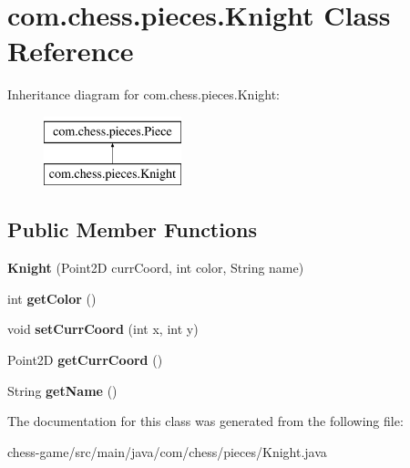 \hypertarget{classcom_1_1chess_1_1pieces_1_1_knight}{}\section{com.\+chess.\+pieces.\+Knight Class Reference}
\label{classcom_1_1chess_1_1pieces_1_1_knight}
Inheritance diagram for com.\+chess.\+pieces.\+Knight\+:\begin{figure}[H]
\begin{center}
\leavevmode
\includegraphics[height=2.000000cm]{classcom_1_1chess_1_1pieces_1_1_knight}
\end{center}
\end{figure}
\subsection*{Public Member Functions}
\begin{DoxyCompactItemize}
\item 
\mbox{\label{classcom_1_1chess_1_1pieces_1_1_knight_a902abfc26eefb14dc79baf1150cc04ab}} 
{\bfseries Knight} (Point2D curr\+Coord, int color, String name)
\item 
\mbox{\label{classcom_1_1chess_1_1pieces_1_1_knight_aef125dc121d519ccd703ba31d6179e46}} 
int {\bfseries get\+Color} ()
\item 
\mbox{\label{classcom_1_1chess_1_1pieces_1_1_knight_a8eb690eecdc63db3d4c64f170a0032a9}} 
void {\bfseries set\+Curr\+Coord} (int x, int y)
\item 
\mbox{\label{classcom_1_1chess_1_1pieces_1_1_knight_a59afbf816626751ca2d72148f3dc5fc6}} 
Point2D {\bfseries get\+Curr\+Coord} ()
\item 
\mbox{\label{classcom_1_1chess_1_1pieces_1_1_knight_ab6b89b48e397d86dbe814e57837c691f}} 
String {\bfseries get\+Name} ()
\end{DoxyCompactItemize}


The documentation for this class was generated from the following file\+:\begin{DoxyCompactItemize}
\item 
chess-\/game/src/main/java/com/chess/pieces/Knight.\+java\end{DoxyCompactItemize}
